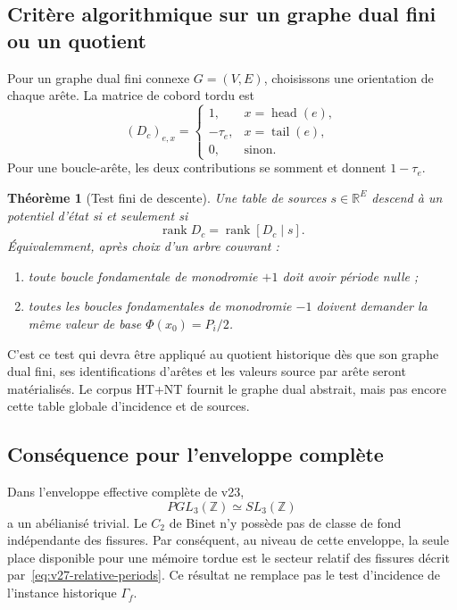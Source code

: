 \documentclass[11pt,a4paper]{article}
\newtheorem{theorem}{Théorème}[section]
\begin{document}
\subsection{Critère algorithmique sur un graphe dual fini ou un quotient}

Pour un graphe dual fini connexe $G=(V,E)$, choisissons une orientation de chaque arête. La matrice de cobord tordu est
\begin{equation}\label{eq:v27-twisted-incidence}
 \boxed{
 (D_c)_{e,x}
 =
 \begin{cases}
 1,&x=\operatorname{head}(e),\\
 -\tau_e,&x=\operatorname{tail}(e),\\
 0,&\text{sinon}.
 \end{cases}}
\end{equation}
Pour une boucle-arête, les deux contributions se somment et donnent $1-\tau_e$.

\begin{theorem}[Test fini de descente]\label{thm:v27-finite-rank-test}
Une table de sources $s\in\mathbb R^E$ descend à un potentiel d'état si et seulement si
\begin{equation}\label{eq:v27-rank-test}
 \boxed{
 \operatorname{rank}D_c
 =
 \operatorname{rank}[D_c\mid s].}
\end{equation}
Équivalemment, après choix d'un arbre couvrant :
\begin{enumerate}[label=\textup{(\roman*)}]
\item toute boucle fondamentale de monodromie $+1$ doit avoir période nulle ;
\item toutes les boucles fondamentales de monodromie $-1$ doivent demander la même valeur de base $\Phi(x_0)=P_i/2$.
\end{enumerate}
\end{theorem}

C'est ce test qui devra être appliqué au quotient historique dès que son graphe dual fini, ses identifications d'arêtes et les valeurs source par arête seront matérialisés. Le corpus HT+NT fournit le graphe dual abstrait, mais pas encore cette table globale d'incidence et de sources.

\subsection{Conséquence pour l'enveloppe complète}

Dans l'enveloppe effective complète de v23,
\[
 PGL_3(\mathbb Z)\simeq SL_3(\mathbb Z)
\]
a un abélianisé trivial. Le $C_2$ de Binet n'y possède pas de classe de fond indépendante des fissures. Par conséquent, au niveau de cette enveloppe, la seule place disponible pour une mémoire tordue est le secteur relatif des fissures décrit par~\eqref{eq:v27-relative-periods}. Ce résultat ne remplace pas le test d'incidence de l'instance historique $\Gamma_f$.
\end{document}
